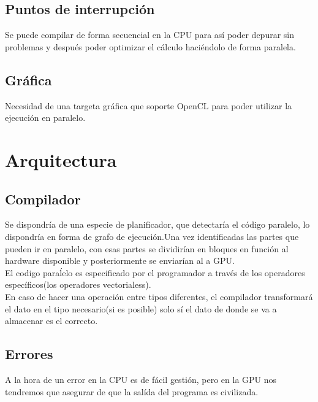 \documentclass[12pt,a4paper]{article}
\begin{document}
\subsection{Puntos de interrupción}
Se puede compilar de forma secuencial en la CPU para así poder depurar sin problemas y después poder optimizar el cálculo haciéndolo de forma paralela.
\subsection{Gráfica}
Necesidad de una targeta gráfica que soporte OpenCL para poder utilizar la ejecución en paralelo.
\section{Arquitectura}
\subsection{Compilador}
Se dispondría de una especie de planificador, que detectaría el código paralelo, lo dispondría en forma de grafo de ejecución.Una vez identificadas las partes que pueden ir en paralelo, con esas partes se dividirían en bloques en función al hardware disponible y posteriormente se enviarían al a GPU.\\
El codigo paraĺelo es especificado por el programador a través de los operadores específicos(los operadores vectorialess).\\
En caso de hacer una operación entre tipos diferentes, el compilador transformará el dato en el tipo necesario(si es posible) solo sí el dato de donde se va a almacenar es el correcto.
\subsection{Errores}
A la hora de un error en la CPU es de fácil gestión, pero en la GPU nos tendremos que asegurar de que la salída del programa es civilizada.
\end{document}
